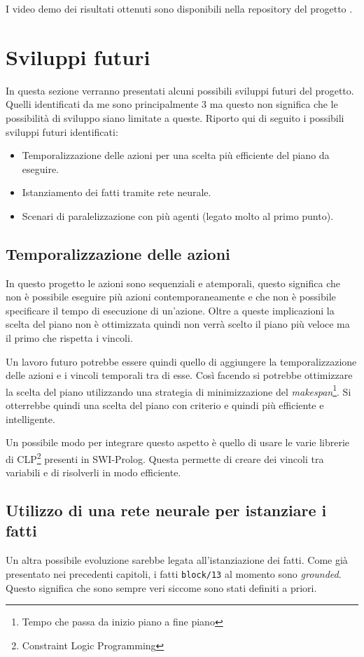 I video demo dei risultati ottenuti sono disponibili nella repository del progetto \cite{gitrepo}.
\section{Sviluppi futuri}
\label{sec:sviluppifuturi}
In questa sezione verranno presentati alcuni possibili sviluppi futuri del progetto. Quelli identificati da me sono principalmente 3 ma questo non significa che le possibilità di sviluppo siano limitate a queste. Riporto qui di seguito i possibili sviluppi futuri identificati:
\begin{itemize}
      \item Temporalizzazione delle azioni per una scelta più efficiente del piano da eseguire.
      \item Istanziamento dei fatti tramite rete neurale.
      \item Scenari di paralelizzazione con più agenti (legato molto al primo punto).
\end{itemize}

\subsection*{Temporalizzazione delle azioni}
\label{subsec:temporalizzazione}
In questo progetto le azioni sono sequenziali e atemporali, questo significa che non è possibile eseguire più azioni contemporaneamente e che non è possibile specificare il tempo di esecuzione di un'azione.
Oltre a queste implicazioni la scelta del piano non è ottimizzata quindi non verrà scelto il piano più veloce ma il primo che rispetta i vincoli.

Un lavoro futuro potrebbe essere quindi quello di aggiungere la temporalizzazione delle azioni e i vincoli temporali tra di esse. Così facendo si potrebbe ottimizzare la scelta del piano utilizzando una strategia di minimizzazione del \textit{makespan}\footnote{Tempo che passa da inizio piano a fine piano}.
Si otterrebbe quindi una scelta del piano con criterio e quindi più efficiente e intelligente. 

Un possibile modo per integrare questo aspetto è quello di usare le varie librerie di CLP\footnote{Constraint Logic Programming} presenti in SWI-Prolog. Questa permette di creare dei vincoli tra variabili e di risolverli in modo efficiente.

\subsection*{Utilizzo di una rete neurale per istanziare i fatti}
\label{subsec:neuralnet}
Un altra possibile evoluzione sarebbe legata all'istanziazione dei fatti. Come già presentato nei precedenti capitoli, i fatti \verb+block/13+ al momento sono \textit{grounded}. 
Questo significa che sono sempre veri siccome sono stati definiti a priori. 

